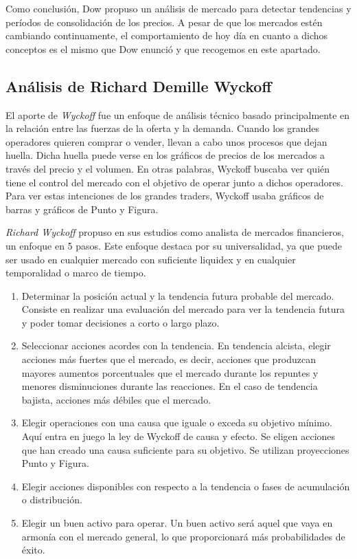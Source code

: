 Como conclusión, Dow propuso un análisis de mercado para detectar tendencias y períodos de consolidación de los precios. A pesar de que los mercados estén cambiando continuamente, el comportamiento de hoy día en cuanto a dichos conceptos es el mismo que Dow enunció y que recogemos en este apartado.


\subsection{Análisis de Richard Demille Wyckoff} \label{wyckoff}

El aporte de \textit{Wyckoff} fue un enfoque de análisis técnico basado principalmente en la relación entre las fuerzas de la oferta y la demanda. Cuando los grandes operadores quieren comprar o vender, llevan a cabo unos procesos que dejan huella. Dicha huella puede verse en los gráficos de precios de los mercados a través del precio y el volumen. En otras palabras, Wyckoff buscaba ver quién tiene el control del mercado con el objetivo de operar junto a dichos operadores. Para ver estas intenciones de los grandes traders, Wyckoff usaba gráficos de barras y gráficos de Punto y Figura. \newline

\textit{Richard Wyckoff} propuso en sus estudios como analista de mercados financieros, un enfoque en 5 pasos. Este enfoque destaca por su universalidad, ya que puede ser usado en cualquier mercado con suficiente liquidex y en cualquier temporalidad o marco de tiempo. \newline

\begin{enumerate}
	\item Determinar la posición actual y la tendencia futura probable del mercado. Consiste en realizar una evaluación del mercado para ver la tendencia futura y poder tomar decisiones a corto o largo plazo.
	\item Seleccionar acciones acordes con la tendencia. En tendencia alcista, elegir acciones más fuertes que el mercado, es decir, acciones que produzcan mayores aumentos porcentuales que el mercado durante los repuntes y menores disminuciones durante las reacciones. En el caso de tendencia bajista, acciones más débiles que el mercado.
	\item Elegir operaciones con una causa que iguale o exceda su objetivo mínimo. Aquí entra en juego la ley de Wyckoff de causa y efecto. Se eligen acciones que han creado una causa suficiente para su objetivo. Se utilizan proyecciones Punto y Figura.
	\item Elegir acciones disponibles con respecto a la tendencia o fases de acumulación o distribución.
	\item Elegir un buen activo para operar. Un buen activo será aquel que vaya en armonía con el mercado general, lo que proporcionará más probabilidades de éxito.
\end{enumerate}

